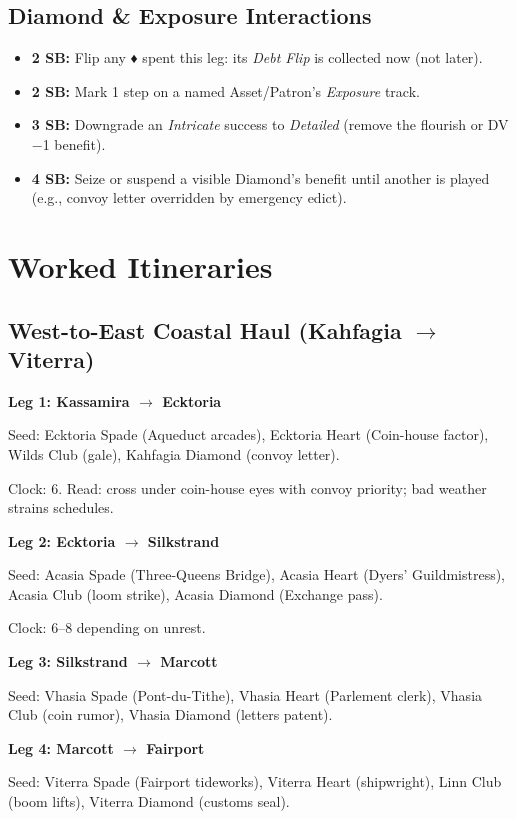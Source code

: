 \documentclass[12pt,oneside]{book}
\renewcommand{\diamondsuit}{♦}
\begin{document}
\subsection{Diamond \& Exposure Interactions}
\begin{itemize}
  \item \textbf{2 SB:} Flip any \diamondsuit{} spent this leg: its \emph{Debt Flip} is collected now (not later).
  \item \textbf{2 SB:} Mark 1 step on a named Asset/Patron's \emph{Exposure} track.
  \item \textbf{3 SB:} Downgrade an \emph{Intricate} success to \emph{Detailed} (remove the flourish or DV −1 benefit).
  \item \textbf{4 SB:} Seize or suspend a visible Diamond's benefit until another is played (e.g., convoy letter overridden by emergency edict).
\end{itemize}

\section{Worked Itineraries}

\subsection{West-to-East Coastal Haul (Kahfagia $\rightarrow$ Viterra)}

\textbf{Leg 1: Kassamira $\rightarrow$ Ecktoria}

Seed: Ecktoria Spade (Aqueduct arcades), Ecktoria Heart (Coin-house factor), Wilds Club (gale), Kahfagia Diamond (convoy letter).

Clock: 6. Read: cross under coin-house eyes with convoy priority; bad weather strains schedules.

\textbf{Leg 2: Ecktoria $\rightarrow$ Silkstrand}

Seed: Acasia Spade (Three-Queens Bridge), Acasia Heart (Dyers' Guildmistress), Acasia Club (loom strike), Acasia Diamond (Exchange pass).

Clock: 6--8 depending on unrest.

\textbf{Leg 3: Silkstrand $\rightarrow$ Marcott}

Seed: Vhasia Spade (Pont-du-Tithe), Vhasia Heart (Parlement clerk), Vhasia Club (coin rumor), Vhasia Diamond (letters patent).

\textbf{Leg 4: Marcott $\rightarrow$ Fairport}

Seed: Viterra Spade (Fairport tideworks), Viterra Heart (shipwright), Linn Club (boom lifts), Viterra Diamond (customs seal).
\end{document}
